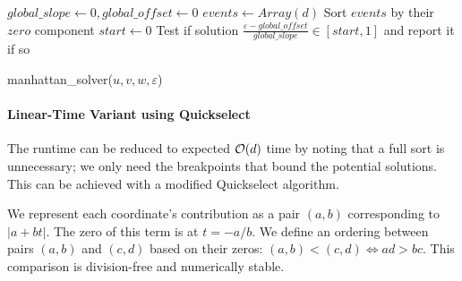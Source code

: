 \begin{algorithm}[ht]
  \DontPrintSemicolon
  \BlankLine
  \(global\_slope \gets 0, global\_offset \gets 0\) \;
  \(events \gets Array(d)\) \;
  Sort \(events\) by their \(zero\) component\;
  \(start \gets 0\)\;
  Test if solution \(\frac{\varepsilon - global\_offset}{global\_slope} \in [start, 1]\) and report it if so\;

  \caption{manhattan\_solver(\(u, v, w, \varepsilon\))}
  \label{algo:solve_manhattan}
\end{algorithm}

\paragraph{Linear-Time Variant using Quickselect}
The runtime can be reduced to expected \(\mathcal{O}(d)\) time by noting that a full sort is unnecessary; we only need the breakpoints that bound the potential solutions. This can be achieved with a modified Quickselect algorithm.

We represent each coordinate's contribution as a pair \((a, b)\) corresponding to \(|a + b t|\). The zero of this term is at \(t = -a/b\). We define an ordering between pairs \((a, b)\) and \((c, d)\) based on their zeros: \((a, b) < (c, d) \iff a d > b c\). This comparison is division-free and numerically stable.

